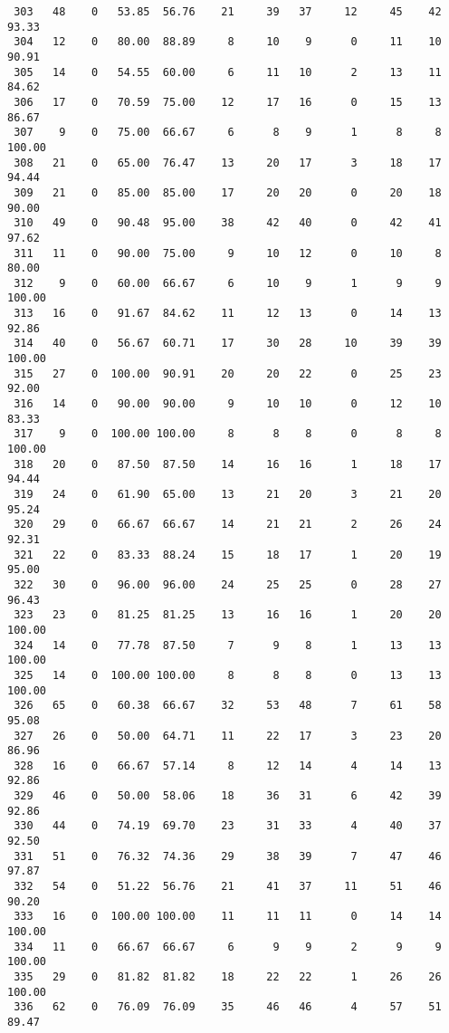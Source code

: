\begin{verbatim}
 303   48    0   53.85  56.76    21     39   37     12     45    42    93.33
 304   12    0   80.00  88.89     8     10    9      0     11    10    90.91
 305   14    0   54.55  60.00     6     11   10      2     13    11    84.62
 306   17    0   70.59  75.00    12     17   16      0     15    13    86.67
 307    9    0   75.00  66.67     6      8    9      1      8     8   100.00
 308   21    0   65.00  76.47    13     20   17      3     18    17    94.44
 309   21    0   85.00  85.00    17     20   20      0     20    18    90.00
 310   49    0   90.48  95.00    38     42   40      0     42    41    97.62
 311   11    0   90.00  75.00     9     10   12      0     10     8    80.00
 312    9    0   60.00  66.67     6     10    9      1      9     9   100.00
 313   16    0   91.67  84.62    11     12   13      0     14    13    92.86
 314   40    0   56.67  60.71    17     30   28     10     39    39   100.00
 315   27    0  100.00  90.91    20     20   22      0     25    23    92.00
 316   14    0   90.00  90.00     9     10   10      0     12    10    83.33
 317    9    0  100.00 100.00     8      8    8      0      8     8   100.00
 318   20    0   87.50  87.50    14     16   16      1     18    17    94.44
 319   24    0   61.90  65.00    13     21   20      3     21    20    95.24
 320   29    0   66.67  66.67    14     21   21      2     26    24    92.31
 321   22    0   83.33  88.24    15     18   17      1     20    19    95.00
 322   30    0   96.00  96.00    24     25   25      0     28    27    96.43
 323   23    0   81.25  81.25    13     16   16      1     20    20   100.00
 324   14    0   77.78  87.50     7      9    8      1     13    13   100.00
 325   14    0  100.00 100.00     8      8    8      0     13    13   100.00
 326   65    0   60.38  66.67    32     53   48      7     61    58    95.08
 327   26    0   50.00  64.71    11     22   17      3     23    20    86.96
 328   16    0   66.67  57.14     8     12   14      4     14    13    92.86
 329   46    0   50.00  58.06    18     36   31      6     42    39    92.86
 330   44    0   74.19  69.70    23     31   33      4     40    37    92.50
 331   51    0   76.32  74.36    29     38   39      7     47    46    97.87
 332   54    0   51.22  56.76    21     41   37     11     51    46    90.20
 333   16    0  100.00 100.00    11     11   11      0     14    14   100.00
 334   11    0   66.67  66.67     6      9    9      2      9     9   100.00
 335   29    0   81.82  81.82    18     22   22      1     26    26   100.00
 336   62    0   76.09  76.09    35     46   46      4     57    51    89.47

\end{verbatim}
